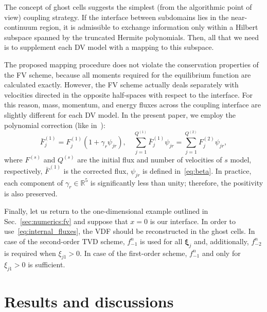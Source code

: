 \documentclass{elsarticle} %
\newcommand{\bxi}{\boldsymbol{\xi}}
\begin{document}
The concept of ghost cells suggests the simplest (from the algorithmic point of view) coupling strategy.
If the interface between subdomains lies in the near-continuum region,
it is admissible to exchange information only within a Hilbert subspace
spanned by the truncated Hermite polynomials.
Then, all that we need is to supplement each DV model with a mapping to this subspace.

The proposed mapping procedure does not violate the conservation properties of the FV scheme,
because all moments required for the equilibrium function are calculated exactly.
However, the FV scheme actually deals separately with velocities
directed in the opposite half-spaces with respect to the interface.
For this reason, mass, momentum, and energy fluxes across the coupling interface
are slightly different  for each DV model.
In the present paper, we employ the polynomial correction (like in~\cite{Aristov1980}):
\begin{equation}\label{eq:poly_correction}
    \bar{F}^{(1)}_j = F^{(1)}_j(1+\gamma_r\psi_{j r}), \quad
    \sum_{j=1}^{Q^{(1)}} \bar{F}^{(1)}_j\psi_{j r} = \sum_{j=1}^{Q^{(2)}} F^{(2)}_j\psi_{j r},
\end{equation}
where \(F^{(s)}\) and \(Q^{(s)}\) are the initial flux and number of velocities of \(s\) model, respectively,
\(\bar{F}^{(1)}\) is the corrected flux, \(\psi_{j r}\) is defined in~\eqref{eq:beta}.
In practice, each component of \(\gamma_r\in\mathbb{R}^5\) is significantly less than unity;
therefore, the positivity is also preserved.

Finally, let us return to the one-dimensional example outlined in Sec.~\ref{sec:numerics:fv}
and suppose that \(x=0\) is our interface.
In order to use~\eqref{eq:internal_fluxes}, the VDF should be reconstructed in the ghost cells.
In case of the second-order TVD scheme, \(f_{-1}^n\) is used for all \(\bxi_j\) and, additionally,
\(f_{-2}^n\) is required when \(\xi_{j1}>0\).
In case of the first-order scheme, \(f_{-1}^n\) and only for \(\xi_{j1}>0\) is sufficient.

\section{Results and discussions}\label{sec:results}
\end{document}
